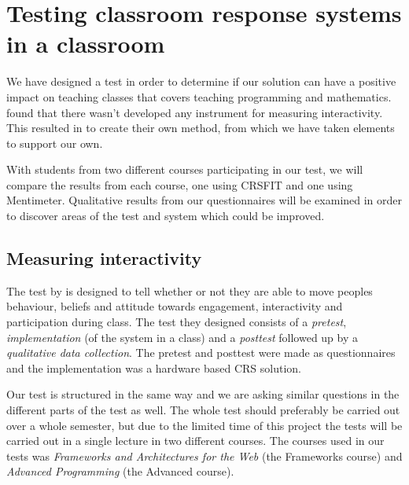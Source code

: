 \section{Testing classroom response systems in a classroom}\label{sec:testingcrs}
We have designed a test in order to determine if our solution can have a positive impact on teaching classes that covers teaching programming and mathematics.  found that there wasn't developed any instrument for measuring interactivity. This resulted in  to create their own method, from which we have taken elements to support our own.

With students from two different courses participating in our test, we will compare the results from each course, one using CRSFIT and one using Mentimeter. Qualitative results from our questionnaires will be examined in order to discover areas of the test and system which could be improved.




\subsection{Measuring interactivity}
The test by  is designed to tell whether or not they are able to move peoples behaviour, beliefs and attitude towards engagement, interactivity and participation during class. The test they designed consists of a \emph{pretest}, \emph{implementation} (of the system in a class) and a \emph{posttest} followed up by a \emph{qualitative data collection}. The pretest and posttest were made as questionnaires and the implementation was a hardware based CRS solution.

Our test is structured in the same way and we are asking similar questions in the different parts of the test as well. The whole test should preferably be carried out over a whole semester, but due to the limited time of this project the tests will be carried out in a single lecture in two different courses. The courses used in our tests was \emph{Frameworks and Architectures for the Web} (the Frameworks course) and \emph{Advanced Programming} (the Advanced course).

